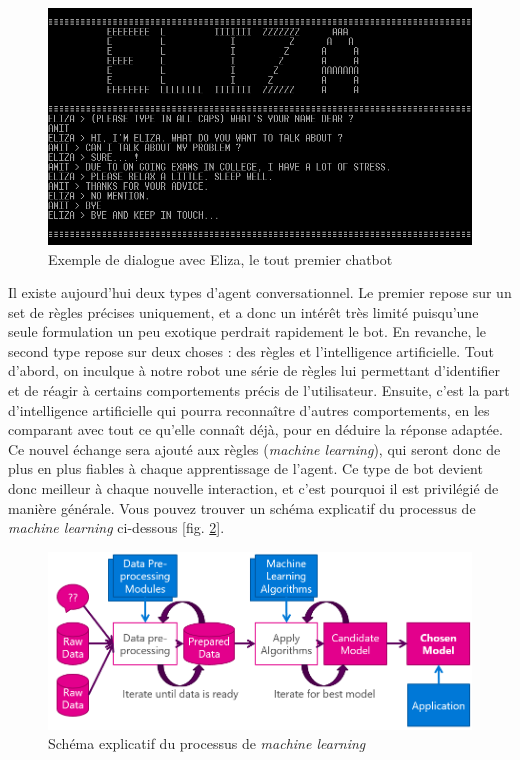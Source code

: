 \documentclass[stage2a]{tnreport} %
\begin{document}
\begin{figure}[h!]
    \centering
    \includegraphics[width=\textwidth]{figures/eliza.png}
    \caption{Exemple de dialogue avec Eliza, le tout premier chatbot~\cite{Eliza}}
    \label{Eliza}
\end{figure}

Il existe aujourd'hui deux types d'agent conversationnel. Le premier repose sur un set de règles précises uniquement, et a donc un intérêt très limité puisqu'une seule formulation un peu exotique perdrait rapidement le bot. En revanche, le second type repose sur deux choses : des règles et l'intelligence artificielle. Tout d'abord, on inculque à notre robot une série de règles lui permettant d'identifier et de réagir à certains comportements précis de l'utilisateur. Ensuite, c'est la part d'intelligence artificielle qui pourra reconnaître d'autres comportements, en les comparant avec tout ce qu'elle connaît déjà, pour en déduire la réponse adaptée. Ce nouvel échange sera ajouté aux règles (\emph{machine learning}), qui seront donc de plus en plus fiables à chaque apprentissage de l'agent. Ce type de bot devient donc meilleur à chaque nouvelle interaction, et c'est pourquoi il est privilégié de manière générale. Vous pouvez trouver un schéma explicatif du processus de \emph{machine learning} ci-dessous [fig. \ref{Machine Learning}].\\

\begin{figure}[h!]
    \centering
    \includegraphics[width=\textwidth]{figures/machine learning.png}
    \caption{Schéma explicatif du processus de \emph{machine learning}~\cite{ML}}
    \label{Machine Learning}
\end{figure}
\end{document}
